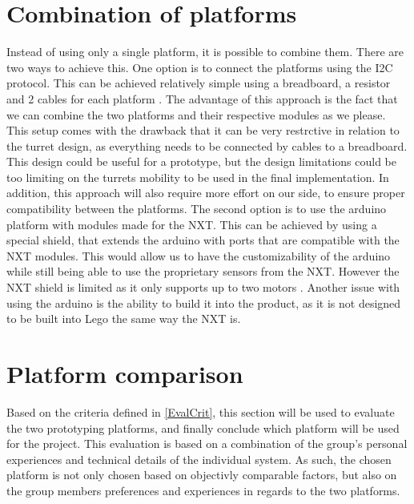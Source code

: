 \section{Combination of platforms}\label{CombPlat}
Instead of using only a single platform, it is possible to combine them. There
are two ways to achieve this. One option is to connect the platforms using the
I2C protocol. This can be achieved relatively simple using a breadboard, a
resistor and 2 cables for each platform \citep{ArduinoNXT}. The advantage of
this approach is the fact that we can combine the two platforms and their
respective modules as we please. This setup comes with the drawback that it can
be very restrctive in relation to the turret design, as everything needs to be
connected by cables to a breadboard. This design could be useful for a
prototype, but the design limitations could be too limiting on the turrets
mobility to be used in the final implementation. In addition, this approach will
also require more effort on our side, to ensure proper compatibility between the
platforms. The second option is to use the arduino platform with modules made
for the NXT. This can be achieved by using a special shield, that
extends the arduino with ports that are compatible with the NXT modules. This
would allow us to have the customizability of the arduino while still being able
to use the proprietary sensors from the NXT. However the NXT shield is limited
as it only supports up to two motors \citep{NXTShield}. Another issue with using
the arduino is the ability to build it into the product, as it is not designed
to be built into Lego the same way the NXT is.\nl

\section{Platform comparison}
Based on the criteria defined in \autoref{EvalCrit}, this section will be used
to evaluate the two prototyping platforms, and finally conclude which platform
will be used for the \name project. This evaluation is based on a combination of
the group's personal experiences and technical details of the individual system.
As such, the chosen platform is not only chosen based on objectivly comparable
factors, but also on the group members preferences and experiences in regards to
the two platforms.


